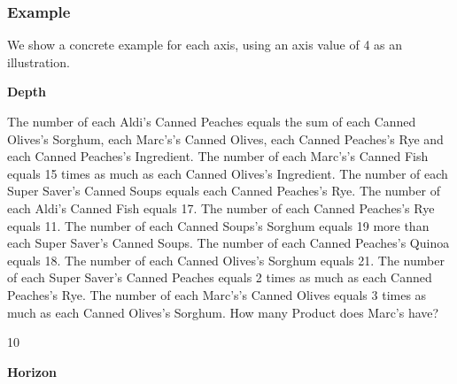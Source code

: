 \subsubsection{Example}
\label{ap:masbench_example}

We show a concrete example for each axis, using an axis value of 4 as an illustration. 

\textbf{Depth}

\begin{systemprompt}[title={Question}]
The number of each Aldi's Canned Peaches equals the sum of each Canned Olives's Sorghum, each Marc's's Canned Olives, each Canned Peaches's Rye and each Canned Peaches's Ingredient. The number of each Marc's's Canned Fish equals 15 times as much as each Canned Olives's Ingredient. The number of each Super Saver's Canned Soups equals each Canned Peaches's Rye. The number of each Aldi's Canned Fish equals 17. The number of each Canned Peaches's Rye equals 11. The number of each Canned Soups's Sorghum equals 19 more than each Super Saver's Canned Soups. The number of each Canned Peaches's Quinoa equals 18. The number of each Canned Olives's Sorghum equals 21. The number of each Super Saver's Canned Peaches equals 2 times as much as each Canned Peaches's Rye. The number of each Marc's's Canned Olives equals 3 times as much as each Canned Olives's Sorghum. How many Product does Marc's have?
\end{systemprompt}
\begin{userprompt}[title={Answer}]
10
\end{userprompt}

\textbf{Horizon}


